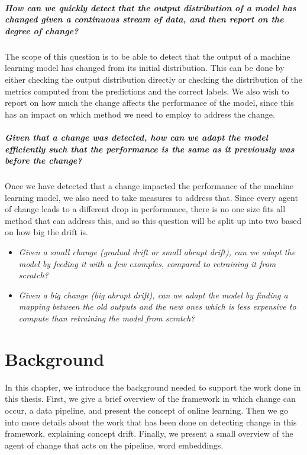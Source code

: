 \documentclass[12pt]{extreport}
\begin{document}
\paragraph*{How can we quickly detect that the output distribution of a model has changed given a continuous stream of data, and then report on the degree of change?} The scope of this question is to be able to detect that the output of a machine learning model has changed from its initial distribution. This can be done by either checking the output distribution directly or checking the distribution of the metrics computed from the predictions and the correct labels. We also wish to report on how much the change affects the performance of the model, since this has an impact on which method we need to employ to address the change.

\paragraph*{Given that a change was detected, how can we adapt the model efficiently such that the performance is the same as it previously was before the change?} Once we have detected that a change impacted the performance of the machine learning model, we also need to take measures to address that. Since every agent of change leads to a different drop in performance, there is no one size fits all method that can address this, and so this question will be split up into two based on how big the drift is.
\begin{itemize}
    \item \emph{Given a small change (gradual drift or small abrupt drift), can we adapt the model by feeding it with a few examples, compared to retraining it from scratch?}
    \item \emph{Given a big change (big abrupt drift), can we adapt the model by finding a mapping between the old outputs and the new ones which is less expensive to compute than retraining the model from scratch?}
\end{itemize}

\chapter{Background} \label{sec:background}

In this chapter, we introduce the background needed to support the work done in this thesis. First, we give a brief overview of the framework in which change can occur, a data pipeline, and present the concept of online learning. Then we go into more details about the work that has been done on detecting change in this framework, explaining concept drift. Finally, we present a small overview of the agent of change that acts on the pipeline, word embeddings.
\end{document}
